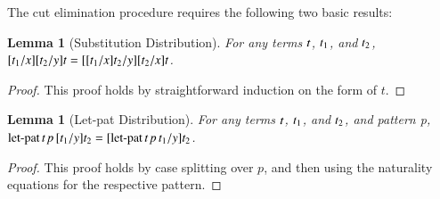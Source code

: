 \documentclass{elsarticle}
\newtheorem{lemma}[theorem]{Lemma}
\begin{document}
\begin{report}
  The cut elimination procedure requires the following two basic
results:
\begin{lemma}[Substitution Distribution]
  \label{lemma:substitution_distribution}
  For any terms $\mathit{t}$, $\mathit{t_{{\mathrm{1}}}}$, and $\mathit{t_{{\mathrm{2}}}}$, $[  \mathit{t_{{\mathrm{1}}}}  /  \mathit{x}  ]  [  \mathit{t_{{\mathrm{2}}}}  /  \mathit{y}  ]  \mathit{t} = [  [  \mathit{t_{{\mathrm{1}}}}  /  \mathit{x}  ]  \mathit{t_{{\mathrm{2}}}}  /  \mathit{y}  ]  [  \mathit{t_{{\mathrm{2}}}}  /  \mathit{x}  ]  \mathit{t}$.
\end{lemma}
\begin{proof}
  This proof holds by straightforward induction on the form of $t$.
\end{proof}

\begin{lemma}[Let-pat Distribution]
  \label{lemma:let-pat_distribution}
  For any terms $\mathit{t}$, $\mathit{t_{{\mathrm{1}}}}$, and $\mathit{t_{{\mathrm{2}}}}$, and pattern p, \\
  $ \mathsf{\operatorname{let-pat} }\, \mathit{t} \, \mathit{p} \, [  \mathit{t_{{\mathrm{1}}}}  /  \mathit{y}  ]  \mathit{t_{{\mathrm{2}}}}  = [   \mathsf{\operatorname{let-pat} }\, \mathit{t} \, \mathit{p} \, \mathit{t_{{\mathrm{1}}}}   /  \mathit{y}  ]  \mathit{t_{{\mathrm{2}}}}$.
\end{lemma}
\begin{proof}
  This proof holds by case splitting over $p$, and then using the
  naturality equations for the respective pattern.
\end{proof}
\end{report}
\end{document}
